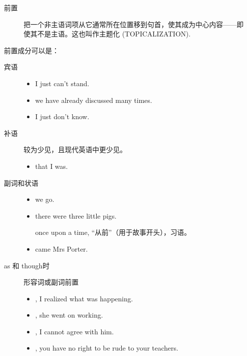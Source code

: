 \begin{description}
\item[前置] 把一个非主语词项从它通常所在位置移到句首，使其成为中心内容——即
  使其不是主语。这也叫作主题化 (TOPICALIZATION).
\end{description}

前置成分可以是：
\begin{description}
\item[宾语]
  \begin{itemize}
  \item {} I just can't stand.
  \item {} we have already discussed many times.

  \item  {} I just don't know.
  \end{itemize}
\item[补语] 较为少见，且现代英语中更少见。
  \begin{itemize}
  \item {} that I was.
  \end{itemize}

\item[副词和状语]
  \begin{itemize}
  \item {} we go.

  \item {} there were three little pigs.

    once upon a time, “从前”（用于故事开头），习语。
  \item {} came Mrs Porter.

  \end{itemize}
\item[as 和 though时] 形容词或副词前置
  \begin{itemize}
  \item {}, I realized what was happening.

  \item {}, she went on working.

  \item {}, I cannot agree with him.

  \item {}, you have no right to be rude to your teachers.

  \end{itemize}
\end{description}


